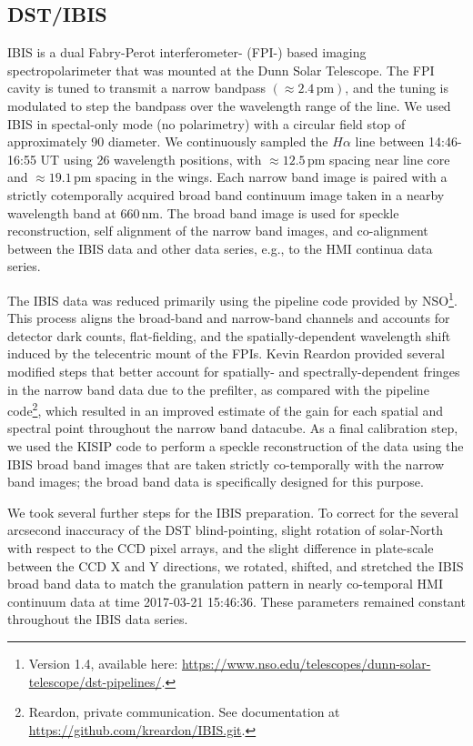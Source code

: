 \documentclass[twocolumn]{aastex62}
\newcommand{\unit}[1]{\ensuremath{\, \mathrm{#1}}}
\newcommand{\halpha}{\ensuremath{H\alpha}}
\begin{document}
\subsection{DST/IBIS}
IBIS is a dual Fabry-Perot interferometer- (FPI-) based imaging spectropolarimeter that was mounted at the Dunn Solar Telescope.
The FPI cavity is tuned to transmit a narrow bandpass $(\approx 2.4\unit{pm})$, and the tuning is modulated to step the bandpass over the wavelength range of the line.
We used IBIS in spectal-only mode (no polarimetry) with a circular field stop of approximately 90\arcsec{} diameter.
We continuously sampled the \halpha{} line between 14:46-16:55 UT using 26 wavelength positions, with $\approx 12.5\unit{pm}$ spacing near line core and $\approx 19.1\unit{pm}$ spacing in the wings.  
Each narrow band image is paired with a strictly cotemporally acquired broad band continuum image taken in a nearby wavelength band at $660\unit{nm}$.
The broad band image is used for speckle reconstruction, self alignment of the narrow band images, and co-alignment between the IBIS data and other data series, e.g., to the HMI continua data series. \par

The IBIS data was reduced primarily using the pipeline code provided by NSO\footnote{Version 1.4, available here: \url{https://www.nso.edu/telescopes/dunn-solar-telescope/dst-pipelines/}.}.  
This process aligns the broad-band and narrow-band channels and accounts for detector dark counts, flat-fielding, and the spatially-dependent wavelength shift induced by the telecentric mount of the FPIs.  
Kevin Reardon provided several modified steps that better account for spatially- and spectrally-dependent fringes in the narrow band data due to the prefilter, as compared with the pipeline code\footnote{Reardon, private communication.  See documentation at \url{https://github.com/kreardon/IBIS.git}.}, which resulted in an improved estimate of the gain for each spatial and spectral point throughout the narrow band datacube.  
As a final calibration step, we used the KISIP code \citep{2008WoegerSPIE,2008WoegerEA_Speckle} to perform a speckle reconstruction of the data using the IBIS broad band images that are taken strictly co-temporally with the narrow band images; the broad band data is specifically designed for this purpose\citep{2008Cauzzi}.\par

We took several further steps for the IBIS preparation.  
To correct for the several arcsecond inaccuracy of the DST blind-pointing, slight rotation of solar-North with respect to the CCD pixel arrays, and the slight difference in plate-scale between the CCD X and Y directions, we rotated, shifted, and stretched the IBIS broad band data to match the granulation pattern in nearly co-temporal HMI continuum data at time 2017-03-21 15:46:36.
These parameters remained constant throughout the IBIS data series.
\par
\end{document}
